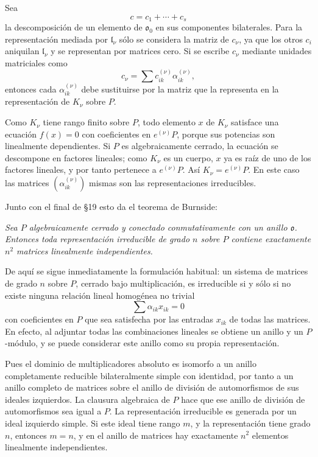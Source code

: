 \documentclass[11pt]{article}
\providecommand{\mo}{\mathfrak{o}}
\providecommand{\ml}{\mathfrak{l}}
\begin{document}
Sea
\[
        c=c_1+\cdots+c_s
\]
la descomposición de un elemento de $\mo_0$ en sus componentes bilaterales. Para la representación mediada por $\ml_\nu$ sólo se considera la matriz de $c_\nu$, ya que los otros $c_i$ aniquilan $\ml_\nu$ y se representan por matrices cero. Si se escribe $c_\nu$ mediante unidades matriciales como
\[
        c_\nu=\sum c_{ik}^{(\nu)}\alpha_{ik}^{(\nu)},
\]
entonces cada $\alpha_{ik}^{(\nu)}$ debe sustituirse por la matriz que la representa en la representación de $K_\nu$ sobre $P$.

Como $K_\nu$ tiene rango finito sobre $P$, todo elemento $x$ de $K_\nu$ satisface una ecuación $f(x)=0$ con coeficientes en $e^{(\nu)}P$, porque sus potencias son linealmente dependientes. Si $P$ es algebraicamente cerrado, la ecuación se descompone en factores lineales; como $K_\nu$ es un cuerpo, $x$ ya es raíz de uno de los factores lineales, y por tanto pertenece a $e^{(\nu)}P$. Así $K_\nu=e^{(\nu)}P$. En este caso las matrices $(\alpha_{ik}^{(\nu)})$ mismas son las representaciones irreducibles.

Junto con el final de §19 esto da el teorema de Burnside:

\emph{Sea $P$ algebraicamente cerrado y conectado conmutativamente con un anillo $\mo$. Entonces toda representación irreducible de grado $n$ sobre $P$ contiene exactamente $n^2$ matrices linealmente independientes.}

De aquí se sigue inmediatamente la formulación habitual: un sistema de matrices de grado $n$ sobre $P$, cerrado bajo multiplicación, es irreducible si y sólo si no existe ninguna relación lineal homogénea no trivial
\[
        \sum \alpha_{ik}x_{ik}=0
\]
con coeficientes en $P$ que sea satisfecha por las entradas $x_{ik}$ de todas las matrices. En efecto, al adjuntar todas las combinaciones lineales se obtiene un anillo y un $P$-módulo, y se puede considerar este anillo como su propia representación.

Pues el dominio de multiplicadores absoluto es isomorfo a un anillo completamente reducible bilateralmente simple con identidad, por tanto a un anillo completo de matrices sobre el anillo de división de automorfismos de sus ideales izquierdos. La clausura algebraica de $P$ hace que ese anillo de división de automorfismos sea igual a $P$. La representación irreducible es generada por un ideal izquierdo simple. Si este ideal tiene rango $m$, y la representación tiene grado $n$, entonces $m=n$, y en el anillo de matrices hay exactamente $n^2$ elementos linealmente independientes.
\end{document}

